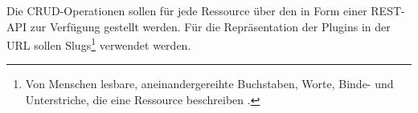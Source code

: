 Die CRUD-Operationen sollen für jede Ressource über den 
in Form einer REST-API zur Verfügung gestellt werden. Für die Repräsentation der Plugins
in der URL sollen Slugs\footnote{Von Menschen lesbare, aneinandergereihte Buchstaben, Worte, Binde- und Unterstriche,
die eine Ressource beschreiben \cite{SlugTermDjango}.} verwendet werden.
